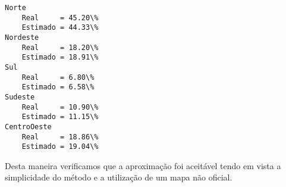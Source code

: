 \documentclass[11pt]{article}
\begin{document}
    \begin{Verbatim}[commandchars=\\\{\}]
Norte
	Real	 = 45.20\%
	Estimado = 44.33\%
Nordeste
	Real	 = 18.20\%
	Estimado = 18.91\%
Sul
	Real	 = 6.80\%
	Estimado = 6.58\%
Sudeste
	Real	 = 10.90\%
	Estimado = 11.15\%
CentroOeste
	Real	 = 18.86\%
	Estimado = 19.04\%

    \end{Verbatim}

    Desta maneira verificamos que a aproximação foi aceitável tendo em vista
a simplicidade do método e a utilização de um mapa não oficial.


    
    
    
    
\end{document}
